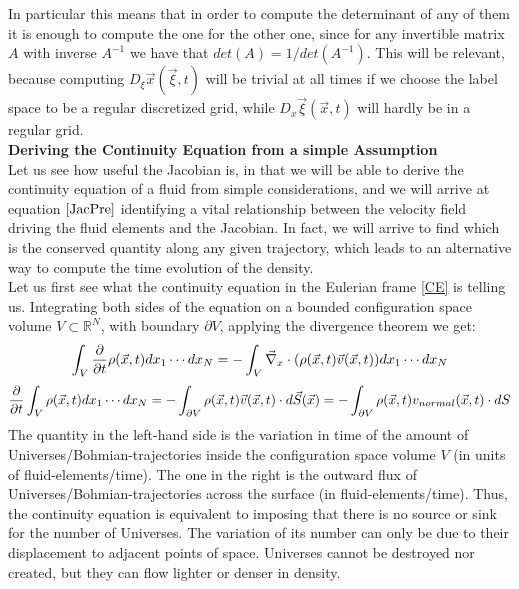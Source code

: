 \documentclass[11pt, a4paper]{article} %
\newcommand{\R}{\mathbb{R}} %
\DeclareRobustCommand{\mybox}[2][gray!10]{%
\begin{tcolorbox}[   %
        left=0.2cm,
        right=0.2cm,
        top=0.15cm,
        bottom=0.15cm,
        colback=#1,
        colframe=#1,
        width=\dimexpr\textwidth\relax, 
        enlarge left by=0mm,
        boxsep=5pt,
        arc=0pt,outer arc=0pt,
        ]
        #2
\end{tcolorbox}
}
\begin{document}
\mybox{
In particular this means that in order to compute the determinant of any of them it is enough to compute the one for the other one, since for any invertible matrix $A$ with inverse $A^{-1}$ we have that $det(A)=1/det(A^{-1})$. This will be relevant, because computing $D_\xi \vec{x}(\vec{\xi},t)$ will be trivial at all times if we choose the label space to be a regular discretized grid, while $D_x \vec{\xi}(\vec{x},t)$ will hardly be in a regular grid.\\

{\bf Deriving the Continuity Equation from a simple Assumption \vspace{0.2cm} \\}
Let us see how useful the Jacobian is, in that we will be able to derive the continuity equation of a fluid from simple considerations, and we will arrive at equation $\eqref{JacPre}$ identifying a vital relationship between the velocity field driving the fluid elements and the Jacobian. In fact, we will arrive to find which is the conserved quantity along any given trajectory, which leads to an alternative way to compute the time evolution of the density.\\

Let us first see what the continuity equation in the Eulerian frame \eqref{CE} is telling us. Integrating both sides of the equation on a bounded configuration space volume $V\subset\R^N$, with boundary $\partial V$, applying the divergence theorem we get:
$$
\int_{V}\pdv{}{t} \rho(\vec{x},t) dx_1\cdots dx_N=-\int_{V}\vec{\nabla}_x\cdot \qty( \rho(\vec{x},t)\vec{v}(\vec{x},t) )dx_1\cdots dx_N
$$
\begin{equation}
\pdv{}{t} \int_{V} \rho(\vec{x},t) dx_1\cdots dx_N=-\int_{\partial V} \rho(\vec{x},t)\vec{v}(\vec{x},t)\cdot d\vec{S}(\vec{x})=-\int_{\partial V} \rho(\vec{x},t)v_{normal}(\vec{x},t)\cdot dS
\end{equation}
The quantity in the left-hand side is the variation in time of the amount of Universes/Bohmian-trajectories inside the configuration space volume $V$ (in units of fluid-elements/time). The one in the right is the outward flux of Universes/Bohmian-trajectories across the surface (in fluid-elements/time). Thus, the continuity equation is equivalent to imposing that there is no source or sink for the number of Universes. The variation of its number can only be due to their displacement to adjacent points of space. Universes cannot be destroyed nor created, but they can flow lighter or denser in density.\\

}
\end{document}
